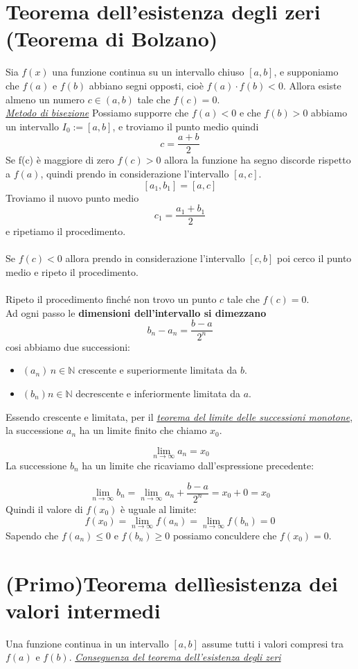 \documentclass{article}
\begin{document}
\section{Teorema dell'esistenza degli zeri (Teorema di Bolzano)}
Sia $f(x)$ una funzione continua su un intervallo chiuso \([a, b]\), e
supponiamo che \(f(a)\) e \(f(b)\) abbiano segni opposti, cioè \(f(a) \cdot
f(b) < 0\). Allora esiste almeno un numero \(c \in (a, b)\) tale che \(f(c) =
0\).\\ \underline{\textit {Metodo di bisezione}} Possiamo supporre che $f(a) <
    0$ e che $f(b) > 0$ abbiamo un intervallo $I_{0} := [a,b]$, e troviamo il punto
medio quindi $$c = \frac{a+b}{2}$$ Se f(c) è maggiore di zero $f(c) > 0$ allora
la funzione ha segno discorde rispetto a $f(a)$, quindi prendo in
considerazione l'intervallo $[a,c]$. $$[a_{1},b_{1}] = [a,c]$$ Troviamo il
nuovo punto medio $$c_{1} = \frac{a_{1}+b_{1}}{2}$$ e ripetiamo il
procedimento.\\\\ Se $f(c) < 0$ allora prendo in considerazione l'intervallo
$[c,b]$ poi cerco il punto medio e ripeto il procedimento.\\\\ Ripeto il
procedimento finché non trovo un punto $c$ tale che $f(c) = 0$.\\ Ad ogni passo
le \textbf{dimensioni dell'intervallo si dimezzano} $$b_n-a_n = \frac{b-a}{2^n}
$$ cosi abbiamo due successioni: \begin {itemize}
\item $(a_{n}) \, n \in \mathbb{N}$ crescente e superiormente limitata da $b$.
\item $(b_{n}) n \in \mathbb{N}$ decrescente e inferiormente limitata da $a$.
\end {itemize}
Essendo crescente e limitata, per il \underline{\textit {teorema del limite delle successioni monotone}}, la successione $a_n$ ha un limite finito che chiamo $x_{0}$.

$$\lim\limits_{ n \to \infty } a_{n} = x_{0}$$
La successione $b_n$ ha un limite che ricaviamo dall'espressione precedente:

$$\lim\limits_{ n \to \infty } b_{n} = \lim\limits_{ n \to \infty } a_n + \frac{b-a}{2^n} = x_{0} + 0 = x_{0}$$
Quindi il valore di $f(x_{0})$ è uguale al limite:
$$
    f(x_{0}) = \lim\limits_{ n \to \infty } f(a_{n}) = \lim\limits_{ n \to \infty } f(b_{n}) = 0$$
Sapendo che $f(a_{n})\leq 0$ e $f(b_{n})\geq0$ possiamo conculdere che $f(x_{0}) = 0$.
\section{(Primo)Teorema dellìesistenza dei valori intermedi}
Una funzione continua in un intervallo $[a,b]$ assume tutti i valori compresi
tra $f(a)$ e $f(b)$. \underline{\textit {Conseguenza del teorema dell'esistenza
        degli zeri}}
\end{document}
